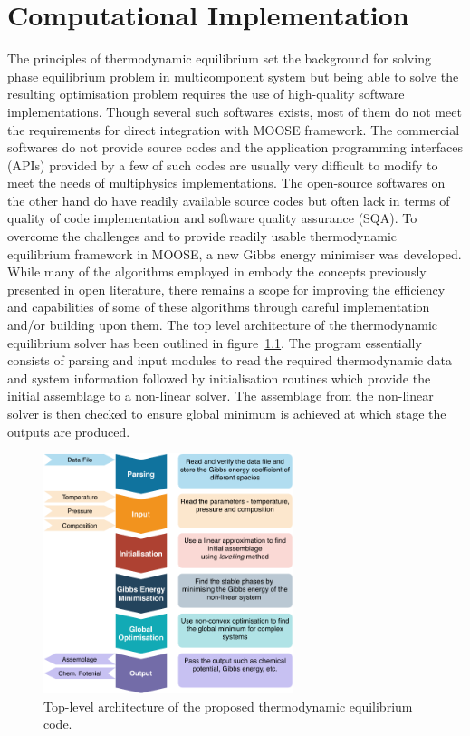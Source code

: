 \chapter{Computational Implementation} \label{chap:implementation}

	The principles of thermodynamic equilibrium set the background for solving phase equilibrium problem in multicomponent system but being able to solve the resulting optimisation problem requires the use of high-quality software implementations. Though several such softwares exists, most of them do not meet the requirements for direct integration with MOOSE framework. The commercial softwares do not provide source codes and the application programming interfaces (APIs) provided by a few of such codes are usually very difficult to modify to meet the needs of multiphysics implementations. The open-source softwares on the other hand do have readily available source codes but often lack in terms of quality of code implementation and software quality assurance (SQA). To overcome the challenges and to provide readily usable thermodynamic equilibrium framework in MOOSE, a new Gibbs energy minimiser was developed.  While many of the algorithms employed in {\GEM} embody the concepts previously presented in open literature, there remains a scope for improving the efficiency and capabilities of some of these algorithms through careful implementation and/or building upon them. The top level architecture of the thermodynamic equilibrium solver has been outlined in figure~\ref{fig:structure}. The program essentially consists of parsing and input modules to read the required thermodynamic data and system information followed by initialisation routines which provide the initial assemblage to a non-linear solver. The assemblage from the non-linear solver is then checked to ensure global minimum is achieved at which stage the outputs are produced.
	\begin{figure}[htbp]
	 	\centering
	   	\includegraphics[width=0.65\textwidth]{figures/YJ_structure.pdf}
	   	\caption{Top-level architecture of the proposed thermodynamic equilibrium code.}
	   	\label{fig:structure}
	\end{figure}

